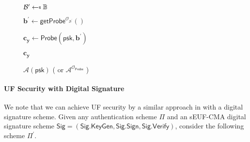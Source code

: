	

\begin{figure}[h]
\centering
	\begin{minipage}[t]{0.6\linewidth}
	\centering
	\begin{algorithm}[H]
	\caption{$\mathcal{A}(\textsf{psk})$ ( or $\mathcal{A}^{\mathcal{O}_\textsf{Probe}}$ ) }
	\label{alg:adv:FP}
	\begin{algorithmic}[1]
		\State $\mathcal{B}^\prime \getsdollar \mathbb{B}$
		
		\State $\mathbf{b}^\prime \gets \textsf{getProbe}^{\mathcal{O}_{\mathcal{B}^\prime }}()$

		\State $\mathbf{c_y} \gets \textsf{Probe}(\textsf{psk}, \mathbf{b}^\prime)$ 

		\State \Return $\mathbf{c_y}$
	\end{algorithmic}
	\end{algorithm}
	\end{minipage}
	
\end{figure}


\paragraph{UF Security with Digital Signature}

We note that we can achieve UF security by a similar approach in \cite{cryptoeprint:2023/481} with a digital signature scheme. Given any authentication scheme $\Pi$ and an sEUF-CMA digital signature scheme $\textsf{Sig} = (\textsf{Sig.KeyGen}, \textsf{Sig.Sign}, \textsf{Sig.Verify})$, consider the following scheme $\Pi^\prime$.

